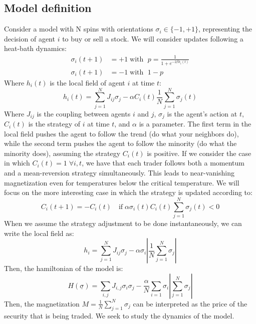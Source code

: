 \subsection{Model definition}
Consider a model with N spins with orientations $\sigma_i\in\{-1,+1\}$, representing the decision of agent $i$ to buy or sell a stock. We will consider updates following a heat-bath dynamics:
\begin{equation}
    \begin{aligned}
        \sigma_i(t+1) &= +1 \;\text{with }\; p = \frac{1}{1+e^{-2\beta h_i(t)}}\\
        \sigma_i(t+1) &= -1 \;\text{with }\; 1-p
    \end{aligned}
\end{equation}
Where $h_i(t)$ is the local field of agent $i$ at time $t$:
\begin{equation}
    h_i(t)=\sum_{j=1}^N J_{i j} \sigma_j-\alpha C_i(t) \frac{1}{N} \sum_{j=1}^N \sigma_j(t)
\end{equation}
Where $J_{i j}$ is the coupling between agents $i$ and $j$, $\sigma_j$ is the agent's action at $t$, $C_i(t)$ is the strategy of $i$ at time $t$, and $\alpha$ is a parameter. The first term in the local field pushes the agent to follow the trend (do what your neighbors do), while the second term pushes the agent to follow the minority (do what the minority does), assuming the strategy $C_i(t)$ is positive. 
If we consider the case in which $C_i(t) = 1\;\forall i, t$, we have that each trader follows both a momentum and a mean-reversion strategy simultaneously. This leads to near-vanishing magnetization even for temperatures below the critical temperature. We will focus on the more interesting case in which the strategy is updated according to:
\begin{equation}
    C_i(t+1) = -C_i(t) \quad\text{if} \; \alpha\sigma_i(t)C_i(t) \sum_{j=1}^N \sigma_j(t)< 0
\end{equation}
When we assume the strategy adjustment to be done instantaneously, we can write the local field as:
\begin{equation}
    h_i=\sum_{j=1}^N J_{i j} \sigma_j-\alpha \sigma_i \left | \frac{1}{N}\sum_{j=1}^N \sigma_j \right |
\end{equation}
Then, the hamiltonian of the model is:
\begin{equation}
    H(\underline{\sigma}) = \sum_{i,j}J_{i,j}\sigma_i\sigma_j - \frac{\alpha}{N}\sum_{i=1} \sigma_i \left | \sum_{j=1}^N \sigma_j \right |
\end{equation}
Then, the magnetization \(M = \frac{1}{N}\sum_{j=1}^N \sigma_j\) can be interpreted as the price of the security that is being traded. We seek to study the dynamics of the model.

